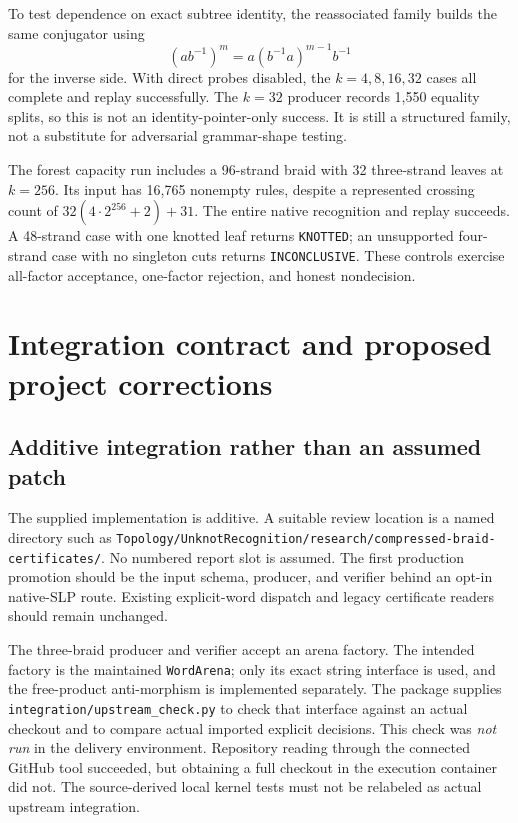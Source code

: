 \documentclass[11pt,letterpaper]{article}
\theoremstyle{definition}\newtheorem{definition}[theorem]{Definition}
\theoremstyle{remark}\newtheorem{remark}[theorem]{Remark}
\begin{document}
To test dependence on exact subtree identity, the reassociated family builds the same conjugator using
\[
 (ab^{-1})^m=a(b^{-1}a)^{m-1}b^{-1}
\]
for the inverse side. With direct probes disabled, the $k=4,8,16,32$ cases all complete and replay successfully. The $k=32$ producer records 1,550 equality splits, so this is not an identity-pointer-only success. It is still a structured family, not a substitute for adversarial grammar-shape testing.

The forest capacity run includes a 96-strand braid with 32 three-strand leaves at $k=256$. Its input has 16,765 nonempty rules, despite a represented crossing count of $32(4\cdot2^{256}+2)+31$. The entire native recognition and replay succeeds. A 48-strand case with one knotted leaf returns \texttt{KNOTTED}; an unsupported four-strand case with no singleton cuts returns \texttt{INCONCLUSIVE}. These controls exercise all-factor acceptance, one-factor rejection, and honest nondecision.

\section{Integration contract and proposed project corrections}
\subsection{Additive integration rather than an assumed patch}
The supplied implementation is additive. A suitable review location is a named directory such as
\texttt{Topology/UnknotRecognition/research/compressed-braid-certificates/}.
No numbered report slot is assumed. The first production promotion should be the input schema, producer, and verifier behind an opt-in native-SLP route. Existing explicit-word dispatch and legacy certificate readers should remain unchanged.

The three-braid producer and verifier accept an arena factory. The intended factory is the maintained \texttt{WordArena}; only its exact string interface is used, and the free-product anti-morphism is implemented separately. The package supplies \texttt{integration/upstream\_check.py} to check that interface against an actual checkout and to compare actual imported explicit decisions. This check was \emph{not run} in the delivery environment. Repository reading through the connected GitHub tool succeeded, but obtaining a full checkout in the execution container did not. The source-derived local kernel tests must not be relabeled as actual upstream integration.
\end{document}
